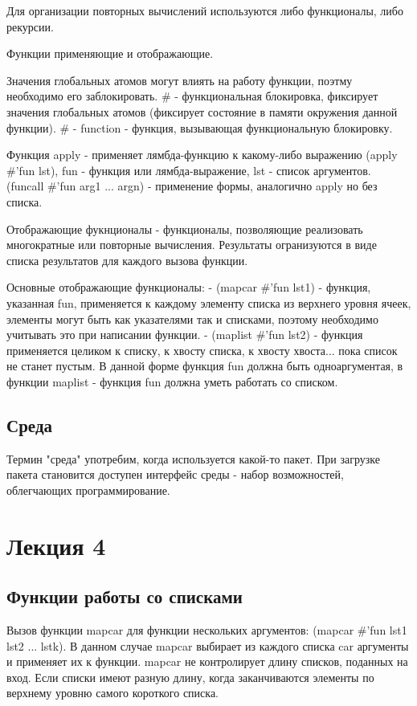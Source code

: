 Для организации повторных вычислений используются либо функционалы, либо рекурсии.

Функции применяющие и отображающие.

Значения глобальных атомов могут влиять на работу функции, поэтму необходимо его заблокировать. \# - функциональная блокировка, фиксирует значения глобальных атомов (фиксирует состояние в памяти окружения данной функции). \# - function - функция, вызывающая функциональную блокировку.

Функция apply - применяет лямбда-функцию к какому-либо выражению (apply \#'fun lst), fun - функция или лямбда-выражение, lst - список аргументов.
(funcall \#'fun arg1 ... argn) - применение формы, аналогично apply но без списка.

Отображающие фукнционалы - функционалы, позволяющие реализовать многократные или повторные вычисления. Результаты огранизуются в виде списка результатов для каждого вызова функции. 

Основные отображающие функционалы:
- (mapcar \#'fun lst1) - функция, указанная fun, применяется к каждому элементу списка из верхнего уровня ячеек, элементы могут быть как указателями так и списками, поэтому необходимо учитывать это при написании функции.
- (maplist \#'fun lst2) - функция применяется целиком к списку, к хвосту списка, к хвосту хвоста... пока список не станет пустым.
В данной форме функция fun должна быть одноаргументая, в функции maplist - функция fun должна уметь работать со списком.

\section{Среда}
Термин "среда" употребим, когда используется какой-то пакет. При загрузке пакета становится доступен интерфейс среды - набор возможностей, облегчающих программирование.

\chapter{Лекция 4}
\section{Функции работы со списками}
Вызов функции mapcar для функции нескольких аргументов: (mapcar \#'fun lst1 lst2 ... lstk). В данном случае mapcar выбирает из каждого списка car аргументы и применяет их к функции. mapcar не контролирует длину списков, поданных на вход. Если списки имеют разную длину, когда заканчиваются элементы по верхнему уровню самого короткого списка.

